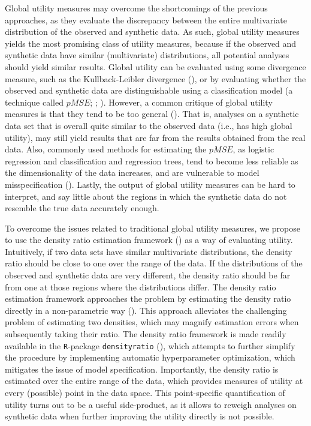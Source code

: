 \documentclass[
]{article}
\begin{document}
Global utility measures may overcome the shortcomings of the previous
approaches, as they evaluate the discrepancy between the entire
multivariate distribution of the observed and synthetic data. As such,
global utility measures yields the most promising class of utility
measures, because if the observed and synthetic data have similar
(multivariate) distributions, all potential analyses should yield
similar results. Global utility can be evaluated using some divergence
measure, such as the Kullback-Leibler divergence
(), or by evaluating
whether the observed and synthetic data are distinguishable using a
classification model (a technique called \(pMSE\);
;
). However, a common
critique of global utility measures is that they tend to be too general
(). That is,
analyses on a synthetic data set that is overall quite similar to the
observed data (i.e., has high global utility), may still yield results
that are far from the results obtained from the real data. Also,
commonly used methods for estimating the \(pMSE\), as logistic
regression and classification and regression trees, tend to become less
reliable as the dimensionality of the data increases, and are vulnerable
to model misspecification
(). Lastly, the
output of global utility measures can be hard to interpret, and say
little about the regions in which the synthetic data do not resemble the
true data accurately enough.

To overcome the issues related to traditional global utility measures,
we propose to use the density ratio estimation framework
() as a way of evaluating utility. Intuitively, if two
data sets have similar multivariate distributions, the density ratio
should be close to one over the range of the data. If the distributions
of the observed and synthetic data are very different, the density ratio
should be far from one at those regions where the distributions differ.
The density ratio estimation framework approaches the problem by
estimating the density ratio directly in a non-parametric way
(). This approach alleviates the challenging problem of
estimating two densities, which may magnify estimation errors when
subsequently taking their ratio. The density ratio framework is made
readily available in the \texttt{R}-package \texttt{densityratio}
(), which attempts to further
simplify the procedure by implementing automatic hyperparameter
optimization, which mitigates the issue of model specification.
Importantly, the density ratio is estimated over the entire range of the
data, which provides measures of utility at every (possible) point in
the data space. This point-specific quantification of utility turns out
to be a useful side-product, as it allows to reweigh analyses on
synthetic data when further improving the utility directly is not
possible.
\end{document}
